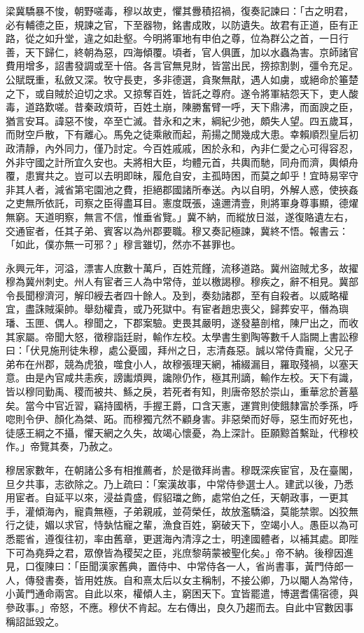 \begin{pinyinscope}
梁冀驕暴不悛，朝野嗟毒，穆以故吏，懼其釁積招禍，復奏記諫曰：「古之明君，必有輔德之臣，規諫之官，下至器物，銘書成敗，以防遺失。故君有正道，臣有正路，從之如升堂，違之如赴壑。今明將軍地有申伯之尊，位為群公之首，一日行善，天下歸仁，終朝為惡，四海傾覆。頃者，官人俱匱，加以水蟲為害。京師諸官費用增多，詔書發調或至十倍。各言官無見財，皆當出民，搒掠割剝，彊令充足。公賦既重，私斂又深。牧守長吏，多非德選，貪聚無猒，遇人如虜，或絕命於箠楚之下，或自賊於迫切之求。又掠奪百姓，皆託之尊府。遂令將軍結怨天下，吏人酸毒，道路歎嗟。昔秦政煩苛，百姓土崩，陳勝奮臂一呼，天下鼎沸，而面諛之臣，猶言安耳。諱惡不悛，卒至亡滅。昔永和之末，綱紀少弛，頗失人望。四五歲耳，而財空戶散，下有離心。馬免之徒乘敝而起，荊揚之閒幾成大患。幸賴順烈皇后初政清靜，內外同力，僅乃討定。今百姓戚戚，困於永和，內非仁愛之心可得容忍，外非守國之計所宜久安也。夫將相大臣，均體元首，共輿而馳，同舟而濟，輿傾舟覆，患實共之。豈可以去明即昧，履危自安，主孤時困，而莫之卹乎！宜時易宰守非其人者，減省第宅園池之費，拒絕郡國諸所奉送。內以自明，外解人惑，使挾姦之吏無所依託，司察之臣得盡耳目。憲度既張，遠邇清壹，則將軍身尊事顯，德燿無窮。天道明察，無言不信，惟垂省覽。」冀不納，而縱放日滋，遂復賂遺左右，交通宦者，任其子弟、賓客以為州郡要職。穆又奏記極諫，冀終不悟。報書云：「如此，僕亦無一可邪？」穆言雖切，然亦不甚罪也。

永興元年，河溢，漂害人庶數十萬戶，百姓荒饉，流移道路。冀州盜賊尤多，故擢穆為冀州刺史。州人有宦者三人為中常侍，並以檄謁穆。穆疾之，辭不相見。冀部令長聞穆濟河，解印綬去者四十餘人。及到，奏劾諸郡，至有自殺者。以威略權宜，盡誅賊渠帥。舉劾權貴，或乃死獄中。有宦者趙忠喪父，歸葬安平，僭為璵璠、玉匣、偶人。穆聞之，下郡案驗。吏畏其嚴明，遂發墓剖棺，陳尸出之，而收其家屬。帝聞大怒，徵穆詣廷尉，輸作左校。太學書生劉陶等數千人詣闕上書訟穆曰：「伏見施刑徒朱穆，處公憂國，拜州之日，志清姦惡。誠以常侍貴寵，父兄子弟布在州郡，競為虎狼，噬食小人，故穆張理天網，補綴漏目，羅取殘禍，以塞天意。由是內官咸共恚疾，謗讟煩興，讒隙仍作，極其刑謫，輸作左校。天下有識，皆以穆同勤禹、稷而被共、鯀之戾，若死者有知，則唐帝怒於崇山，重華忿於蒼墓矣。當今中官近習，竊持國柄，手握王爵，口含天憲，運賞則使餓隸富於季孫，呼唿則令伊、顏化為桀、跖。而穆獨亢然不顧身害。非惡榮而好辱，惡生而好死也，徒感王綱之不攝，懼天網之久失，故竭心懷憂，為上深計。臣願黥首繫趾，代穆校作。」帝覽其奏，乃赦之。

穆居家數年，在朝諸公多有相推薦者，於是徵拜尚書。穆既深疾宦官，及在臺閣，旦夕共事，志欲除之。乃上疏曰：「案漢故事，中常侍參選士人。建武以後，乃悉用宦者。自延平以來，浸益貴盛，假貂璫之飾，處常伯之任，天朝政事，一更其手，灌傾海內，寵貴無極，子弟親戚，並荷榮任，故放濫驕溢，莫能禁禦。凶狡無行之徒，媚以求官，恃埶怙寵之輩，漁食百姓，窮破天下，空竭小人。愚臣以為可悉罷省，遵復往初，率由舊章，更選海內清淳之士，明達國體者，以補其處。即陛下可為堯舜之君，眾僚皆為稷契之臣，兆庶黎萌蒙被聖化矣。」帝不納。後穆因進見，口復陳曰：「臣聞漢家舊典，置侍中、中常侍各一人，省尚書事，黃門侍郎一人，傳發書奏，皆用姓族。自和熹太后以女主稱制，不接公卿，乃以閹人為常侍，小黃門通命兩宮。自此以來，權傾人主，窮困天下。宜皆罷遣，博選耆儒宿德，與參政事。」帝怒，不應。穆伏不肯起。左右傳出，良久乃趨而去。自此中官數因事稱詔詆毀之。


\end{pinyinscope}
